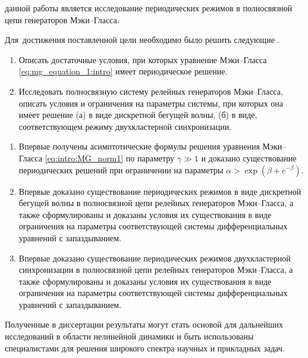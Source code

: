 
{\aim} данной работы является исследование периодических режимов в полносвязной цепи генераторов Мэки--Гласса.

Для~достижения поставленной цели необходимо было решить следующие {\tasks}.
\begin{enumerate}[beginpenalty=10000] %
	\item Описать достаточные условия, при которых уравнение Мэки--Гласса \eqref{eq:mg_equation_1:intro} имеет периодическое решение.
	\item Исследовать полносвязную систему релейных генераторов Мэки--Гласса, описать условия и ограничения на параметры системы, при которых она имеет решение (а) в виде дискретной бегущей волны, (б) в виде, соответствующем режиму двухкластерной синхронизации.
\end{enumerate}


{\novelty}
\begin{enumerate}[beginpenalty=10000] %
  \item Впервые получены асимптотические формулы решения уравнения Мэки--Гласса \eqref{eq:intro:MG_norm1} по параметру $\gamma \gg 1$ и доказано существование периодических решений при ограничении на параметры $\alpha > \exp(\beta + e^{-\beta})$.
  \item Впервые доказано существование периодических режимов в виде дискретной бегущей волны в полносвязной цепи релейных генераторов Мэки--Гласса, а также сформулированы и доказаны условия их существования в виде ограничения на параметры соответствующей системы дифференциальных уравнений с запаздыванием.
  \item Впервые доказано существование периодических режимов двухкластерной синхронизации в полносвязной цепи релейных генераторов Мэки--Гласса, а также сформулированы и доказаны условия их существования в виде ограничения на параметры соответствующей системы дифференциальных уравнений с запаздыванием.
\end{enumerate}

{\influence} Полученные в диссертации результаты могут стать основой для дальнейших исследований в области нелинейной динамики и быть использованы специалистами для решения широкого спектра научных и прикладных задач.

